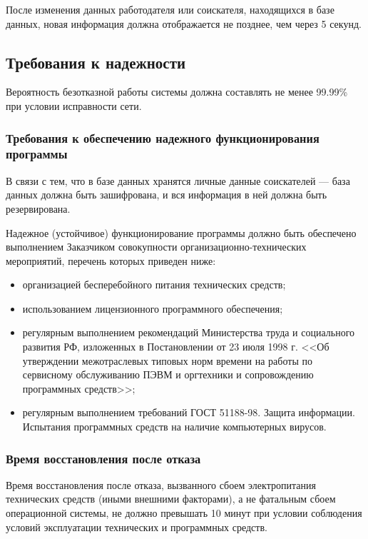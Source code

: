 \documentclass[a4page]{article}
\begin{document}
После изменения данных работодателя или соискателя, находящихся в базе данных, новая информация должна отображается не позднее, чем через 5 секунд.

\subsection{Требования к надежности}

Вероятность безотказной работы системы должна составлять не менее 99.99\% при условии исправности сети.

\subsubsection{Требования к обеспечению надежного функционирования программы}

В связи с тем, что в базе данных хранятся личные данные соискателей --- база данных должна быть зашифрована, и вся информация в ней должна быть резервирована.

Надежное (устойчивое) функционирование программы должно быть обеспечено выполнением Заказчиком совокупности организационно-технических мероприятий, перечень которых приведен ниже:

\begin{itemize}
  \item организацией бесперебойного питания технических средств;
  \item использованием лицензионного программного обеспечения;
  \item регулярным выполнением рекомендаций Министерства труда и социального развития РФ, изложенных в Постановлении от 23 июля 1998 г. <<Об утверждении межотраслевых типовых норм времени на работы по сервисному обслуживанию ПЭВМ и оргтехники и сопровождению программных средств>>;
  \item регулярным выполнением требований ГОСТ 51188-98. Защита информации. Испытания программных средств на наличие компьютерных вирусов.
\end{itemize}

\subsubsection{Время восстановления после отказа}

Время восстановления после отказа, вызванного сбоем электропитания технических средств (иными внешними факторами), а не фатальным сбоем операционной системы, не должно превышать 10 минут при условии соблюдения условий эксплуатации технических и программных средств.
\end{document}
